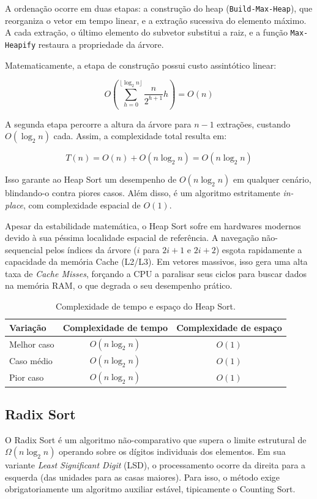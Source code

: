 \documentclass{article}
\begin{document}
    A ordenação ocorre em duas etapas: a construção do heap (\texttt{Build-Max-Heap}), que reorganiza o vetor em tempo linear, e a extração sucessiva do elemento máximo. A cada extração, o último elemento do subvetor substitui a raiz, e a função \texttt{Max-Heapify} restaura a propriedade da árvore.

    Matematicamente, a etapa de construção possui custo assintótico linear:

    $$
        O\left(\sum_{h=0}^{\lfloor\log_2 n\rfloor} \frac{n}{2^{h+1}} h\right) = O(n)
    $$

    A segunda etapa percorre a altura da árvore para $n-1$ extrações, custando $O(\log_2 n)$ cada. Assim, a complexidade total resulta em:

    $$
        T(n) = O(n) + O(n \log_2 n) = O(n \log_2 n)
    $$

    Isso garante ao Heap Sort um desempenho de $O(n \log_2 n)$ em qualquer cenário, blindando-o contra piores casos. Além disso, é um algoritmo estritamente \textit{in-place}, com complexidade espacial de $O(1)$.

    Apesar da estabilidade matemática, o Heap Sort sofre em hardwares modernos devido à sua péssima localidade espacial de referência. A navegação não-sequencial pelos índices da árvore ($i$ para $2i+1$ e $2i+2$) esgota rapidamente a capacidade da memória Cache (L2/L3). Em vetores massivos, isso gera uma alta taxa de \textit{Cache Misses}, forçando a CPU a paralisar seus ciclos para buscar dados na memória RAM, o que degrada o seu desempenho prático.

    \begin{table}[H]
        \centering
        \label{tab:complexidade_heap}
        \begin{tabular}{lcc}
        \toprule
        \textbf{Variação} & \textbf{Complexidade de tempo} & \textbf{Complexidade de espaço} \\
        \midrule
        Melhor caso     & $O(n\log_2 n)$ & $O(1)$ \\
        Caso médio      & $O(n\log_2 n)$ & $O(1)$ \\
        Pior caso       & $O(n\log_2 n)$ & $O(1)$ \\
        \bottomrule
        \end{tabular}
        \caption{Complexidade de tempo e espaço do Heap Sort.}
    \end{table}

\subsection{Radix Sort}
    O Radix Sort é um algoritmo não-comparativo que supera o limite estrutural de $\Omega(n \log_2 n)$ operando sobre os dígitos individuais dos elementos. Em sua variante \textit{Least Significant Digit} (LSD), o processamento ocorre da direita para a esquerda (das unidades para as casas maiores). Para isso, o método exige obrigatoriamente um algoritmo auxiliar estável, tipicamente o Counting Sort.
\end{document}
